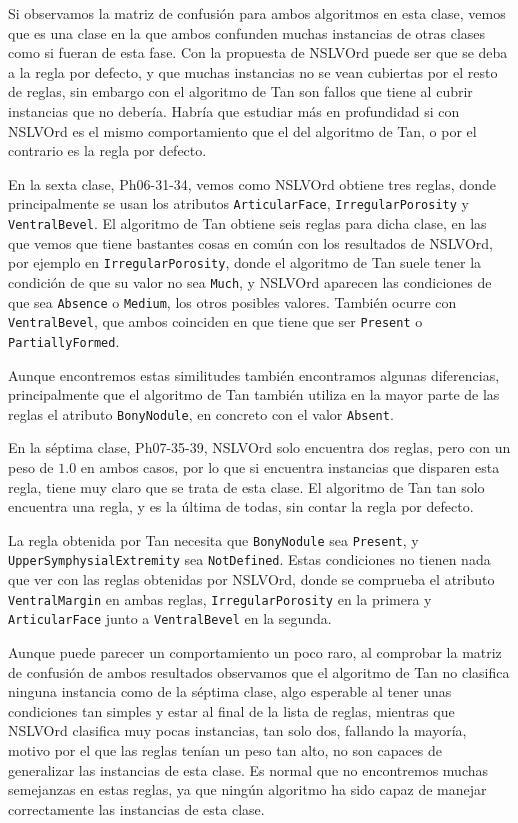 Si observamos la matriz de confusión para ambos algoritmos en esta clase, vemos que es una clase en la que ambos confunden muchas instancias de otras clases como si fueran de esta fase. Con la propuesta de NSLVOrd puede ser que se deba a la regla por defecto, y que muchas instancias no se vean cubiertas por el resto de reglas, sin embargo con el algoritmo de Tan son fallos que tiene al cubrir instancias que no debería. Habría que estudiar más en profundidad si con NSLVOrd es el mismo comportamiento que el del algoritmo de Tan, o por el contrario es la regla por defecto.


En la sexta clase, Ph06-31-34, vemos como NSLVOrd obtiene tres reglas, donde principalmente se usan los atributos \texttt{ArticularFace}, \texttt{IrregularPorosity} y \texttt{VentralBevel}. El algoritmo de Tan obtiene seis reglas para dicha clase, en las que vemos que tiene bastantes cosas en común con los resultados de NSLVOrd, por ejemplo en \texttt{IrregularPorosity}, donde el algoritmo de Tan suele tener la condición de que su valor no sea \texttt{Much}, y NSLVOrd aparecen las condiciones de que sea \texttt{Absence} o \texttt{Medium}, los otros posibles valores. También ocurre con \texttt{VentralBevel}, que ambos coinciden en que tiene que ser \texttt{Present} o \texttt{PartiallyFormed}.

Aunque encontremos estas similitudes también encontramos algunas diferencias, principalmente que el algoritmo de Tan también utiliza en la mayor parte de las reglas el atributo \texttt{BonyNodule}, en concreto con el valor \texttt{Absent}.

En la séptima clase, Ph07-35-39, NSLVOrd solo encuentra dos reglas, pero con un peso de $1.0$ en ambos casos, por lo que si encuentra instancias que disparen esta regla, tiene muy claro que se trata de esta clase. El algoritmo de Tan tan solo encuentra una regla, y es la última de todas, sin contar la regla por defecto.

La regla obtenida por Tan necesita que \texttt{BonyNodule} sea \texttt{Present}, y \texttt{UpperSymphysialExtremity} sea \texttt{NotDefined}. Estas condiciones no tienen nada que ver con las reglas obtenidas por NSLVOrd, donde se comprueba el atributo \texttt{VentralMargin} en ambas reglas, \texttt{IrregularPorosity} en la primera y \texttt{ArticularFace} junto a \texttt{VentralBevel} en la segunda.

Aunque puede parecer un comportamiento un poco raro, al comprobar la matriz de confusión de ambos resultados observamos que el algoritmo de Tan no clasifica ninguna instancia como de la séptima clase, algo esperable al tener unas condiciones tan simples y estar al final de la lista de reglas, mientras que NSLVOrd clasifica muy pocas instancias, tan solo dos, fallando la mayoría, motivo por el que las reglas tenían un peso tan alto, no son capaces de generalizar las instancias de esta clase. Es normal que no encontremos muchas semejanzas en estas reglas, ya que ningún algoritmo ha sido capaz de manejar correctamente las instancias de esta clase.

